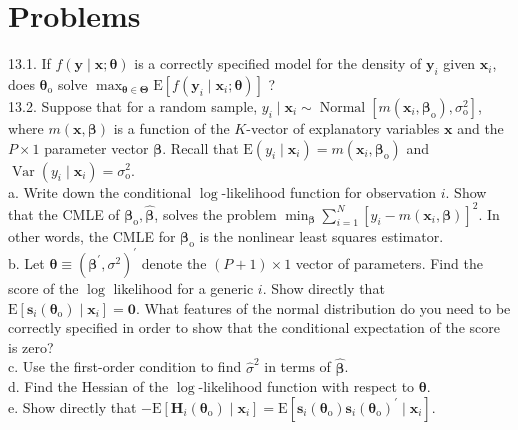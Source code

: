 \documentclass[10pt]{article}
\begin{document}
\section*{Problems}
13.1. If $f(\mathbf{y} \mid \mathbf{x} ; \boldsymbol{\theta})$ is a correctly specified model for the density of $\mathbf{y}_{i}$ given $\mathbf{x}_{i}$, does $\boldsymbol{\theta}_{\mathrm{o}}$ solve $\max _{\boldsymbol{\theta} \in \boldsymbol{\Theta}} \mathrm{E}\left[f\left(\mathbf{y}_{i} \mid \mathbf{x}_{i} ; \boldsymbol{\theta}\right)\right]$ ?\\
13.2. Suppose that for a random sample, $y_{i} \mid \mathbf{x}_{i} \sim \operatorname{Normal}\left[m\left(\mathbf{x}_{i}, \boldsymbol{\beta}_{\mathrm{o}}\right), \sigma_{\mathrm{o}}^{2}\right]$, where $m(\mathbf{x}, \boldsymbol{\beta})$ is a function of the $K$-vector of explanatory variables $\mathbf{x}$ and the $P \times 1$ parameter vector $\boldsymbol{\beta}$. Recall that $\mathrm{E}\left(y_{i} \mid \mathbf{x}_{i}\right)=m\left(\mathbf{x}_{i}, \boldsymbol{\beta}_{\mathrm{o}}\right)$ and $\operatorname{Var}\left(y_{i} \mid \mathbf{x}_{i}\right)=\sigma_{\mathrm{o}}^{2}$.\\
a. Write down the conditional $\log$-likelihood function for observation $i$. Show that the CMLE of $\boldsymbol{\beta}_{\mathrm{o}}, \hat{\boldsymbol{\beta}}$, solves the problem $\min _{\boldsymbol{\beta}} \sum_{i=1}^{N}\left[y_{i}-m\left(\mathbf{x}_{i}, \boldsymbol{\beta}\right)\right]^{2}$. In other words, the CMLE for $\boldsymbol{\beta}_{\mathrm{o}}$ is the nonlinear least squares estimator.\\
b. Let $\boldsymbol{\theta} \equiv\left(\boldsymbol{\beta}^{\prime}, \sigma^{2}\right)^{\prime}$ denote the $(P+1) \times 1$ vector of parameters. Find the score of the $\log$ likelihood for a generic $i$. Show directly that $\mathrm{E}\left[\mathbf{s}_{i}\left(\boldsymbol{\theta}_{\mathrm{o}}\right) \mid \mathbf{x}_{i}\right]=\mathbf{0}$. What features of the normal distribution do you need to be correctly specified in order to show that the conditional expectation of the score is zero?\\
c. Use the first-order condition to find $\hat{\sigma}^{2}$ in terms of $\hat{\boldsymbol{\beta}}$.\\
d. Find the Hessian of the $\log$-likelihood function with respect to $\boldsymbol{\theta}$.\\
e. Show directly that $-\mathrm{E}\left[\mathbf{H}_{i}\left(\boldsymbol{\theta}_{\mathrm{o}}\right) \mid \mathbf{x}_{i}\right]=\mathrm{E}\left[\mathbf{s}_{i}\left(\boldsymbol{\theta}_{\mathrm{o}}\right) \mathbf{s}_{i}\left(\boldsymbol{\theta}_{\mathrm{o}}\right)^{\prime} \mid \mathbf{x}_{i}\right]$.\\
\end{document}
